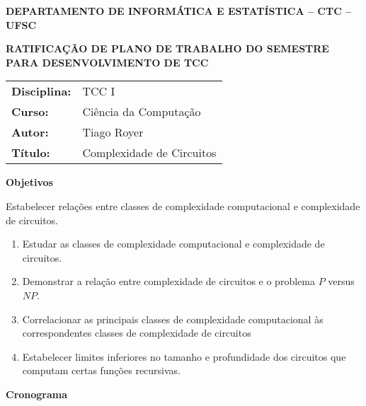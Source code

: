 \documentclass[12pt]{letter}
\begin{document}
\begin{centering}

    \textbf{DEPARTAMENTO DE INFORMÁTICA E ESTATÍSTICA -- CTC -- UFSC}

    \textbf{RATIFICAÇÃO DE PLANO DE TRABALHO DO SEMESTRE \\ PARA DESENVOLVIMENTO DE TCC}

\end{centering}


\vspace{1em}
\setlength\extrarowheight{5pt}
\begin{tabular}{l l}
    \textbf{Disciplina:} & TCC I \\
    \textbf{Curso:}      & Ciência da Computação \\
    \textbf{Autor:}      & Tiago Royer \\
    \textbf{Título:}     & Complexidade de Circuitos \\
\end{tabular}


\vspace{1em}
{\large \textbf{Objetivos}}

Estabelecer relações entre classes de complexidade computacional
e complexidade de circuitos.

\begin{enumerate}
    \item Estudar as classes de complexidade computacional
        e complexidade de circuitos.
    \item Demonstrar a relação entre complexidade de circuitos
        e o problema $P$ versus $NP$.
    \item Correlacionar as principais classes de complexidade computacional
        às correspondentes classes de complexidade de circuitos
    \item Estabelecer limites inferiores no tamanho e profundidade dos circuitos
        que computam certas funções recursivas.
\end{enumerate}


\vspace{1em}
{\large \textbf{Cronograma}}
\end{document}
